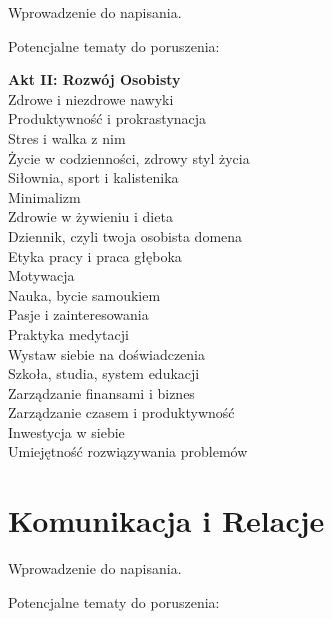 \documentclass[]{coda-art}
\begin{document}
Wprowadzenie do napisania.

\vin Potencjalne tematy do poruszenia:

\textbf{Akt II: Rozwój Osobisty} \\
Zdrowe i niezdrowe nawyki \\
Produktywność i prokrastynacja \\
Stres i walka z nim \\
Życie w codzienności, zdrowy styl życia \\
Siłownia, sport i kalistenika \\
Minimalizm \\
Zdrowie w żywieniu i dieta \\
Dziennik, czyli twoja osobista domena \\
Etyka pracy i praca głęboka \\
Motywacja \\
Nauka, bycie samoukiem \\
Pasje i zainteresowania \\
Praktyka medytacji \\
Wystaw siebie na doświadczenia \\
Szkoła, studia, system edukacji \\
Zarządzanie finansami i biznes \\
Zarządzanie czasem i produktywność \\
Inwestycja w siebie \\
Umiejętność rozwiązywania problemów



\clearpage\part{Komunikacja i Relacje}
\label{akt:komunikacja}

Wprowadzenie do napisania.

\vin Potencjalne tematy do poruszenia:
\end{document}
